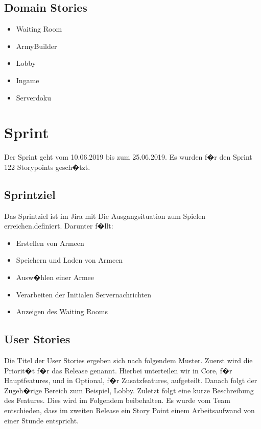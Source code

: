 \documentclass[12pt, titlepage]{scrartcl}
\newcommand{\RN}[1]{%
	\textup{\uppercase\expandafter{\romannumeral#1}}%
}
\begin{document}
		
	\subsection{Domain Stories}
		\begin{itemize}
			\item Waiting Room
			\item ArmyBuilder
			\item Lobby
			\item Ingame
			\item Serverdoku
		\end{itemize}
	
	\section{Sprint \RN{3}}
	
		Der Sprint \RN{3} geht vom 10.06.2019 bis zum 25.06.2019. Es wurden f�r den Sprint 122 Storypoints gesch�tzt.
		\subsection{Sprintziel}
		Das Sprintziel ist im Jira mit \glqq Die Ausgangsituation zum Spielen erreichen.\grqq definiert. Darunter f�llt:
		\begin{itemize}
			\item Erstellen von Armeen
			\item Speichern und Laden von Armeen
			\item Ausw�hlen einer Armee
			\item Verarbeiten der Initialen Servernachrichten
			\item Anzeigen des Waiting Rooms
		\end{itemize}
		\subsection{User Stories}
		\label{UserStoriesSprint3}
		Die Titel der User Stories ergeben sich nach folgendem Muster. Zuerst wird die Priorit�t f�r das Release genannt. Hierbei unterteilen wir in \glqq Core\grqq, f�r Hauptfeatures, und in \glqq Optional\grqq, f�r Zusatzfeatures, aufgeteilt. Danach folgt der Zugeh�rige Bereich zum Beispiel, \glqq Lobby\grqq. Zuletzt folgt eine kurze Beschreibung des Features. Dies wird im Folgendem beibehalten. Es wurde vom Team entschieden, dass im zweiten Release ein Story Point einem Arbeitsaufwand von einer Stunde entspricht.
		
		
\end{document}

